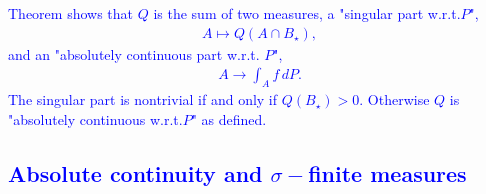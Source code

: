 \documentclass{report}
\begin{document}
\textcolor{blue}{Theorem shows that $Q$ is the sum of two measures, a "singular part w.r.t.$P$",
\begin{align*}
    A\mapsto Q(A\cap B_{\star}),
\end{align*}
and an "absolutely continuous part w.r.t. $P$",
\begin{align*}
    A\to \int_Af\,dP.
\end{align*}The singular part is nontrivial if and only if $Q(B_{\star})>0$. Otherwise $Q$ is "absolutely continuous w.r.t.$P$" as defined.

\subsection{Absolute continuity and $\sigma-$finite measures}
\ex{}{

}}
\end{document}
